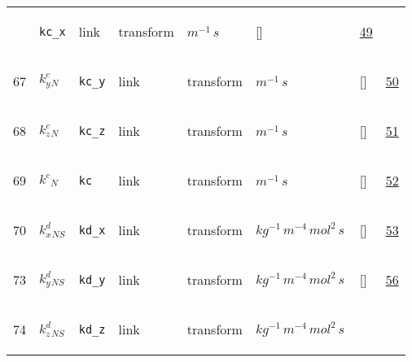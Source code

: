 \begin{longtable}{|p{1cm}|p{3cm}|p{3cm}|p{7cm}|p{3.0cm}|p{3cm}|p{2cm}|p{1cm}|}
             & \verb|kc_x|
             & link
             & \begin{lay}transform \end{lay}
             & $ m^{-1} \,s \, $
             & []
             & \hyperlink{"e:49"}{ 49 }
                 \\
    67
             & \hypertarget{"v:67"}{ $ {k^{c}_{y}}{_{N}} $}
             & \verb|kc_y|
             & link
             & \begin{lay}transform \end{lay}
             & $ m^{-1} \,s \, $
             & []
             & \hyperlink{"e:50"}{ 50 }
                 \\
    68
             & \hypertarget{"v:68"}{ $ {k^{c}_{z}}{_{N}} $}
             & \verb|kc_z|
             & link
             & \begin{lay}transform \end{lay}
             & $ m^{-1} \,s \, $
             & []
             & \hyperlink{"e:51"}{ 51 }
                 \\
    69
             & \hypertarget{"v:69"}{ $ {k^{c}}{_{N}} $}
             & \verb|kc|
             & link
             & \begin{lay}transform \end{lay}
             & $ m^{-1} \,s \, $
             & []
             & \hyperlink{"e:52"}{ 52 }
                 \\
    70
             & \hypertarget{"v:70"}{ $ {k^{d}_{x}}{_{{N S}}} $}
             & \verb|kd_x|
             & link
             & \begin{lay}transform \end{lay}
             & $ kg^{-1} \,m^{-4} \,mol^{2} \,s \, $
             & []
             & \hyperlink{"e:53"}{ 53 }
                 \\
    73
             & \hypertarget{"v:73"}{ $ {k^{d}_{y}}{_{{N S}}} $}
             & \verb|kd_y|
             & link
             & \begin{lay}transform \end{lay}
             & $ kg^{-1} \,m^{-4} \,mol^{2} \,s \, $
             & []
             & \hyperlink{"e:56"}{ 56 }
                 \\
    74
             & \hypertarget{"v:74"}{ $ {k^{d}_{z}}{_{{N S}}} $}
             & \verb|kd_z|
             & link
             & \begin{lay}transform \end{lay}
             & $ kg^{-1} \,m^{-4} \,mol^{2} \,s \, $

\end{longtable}
